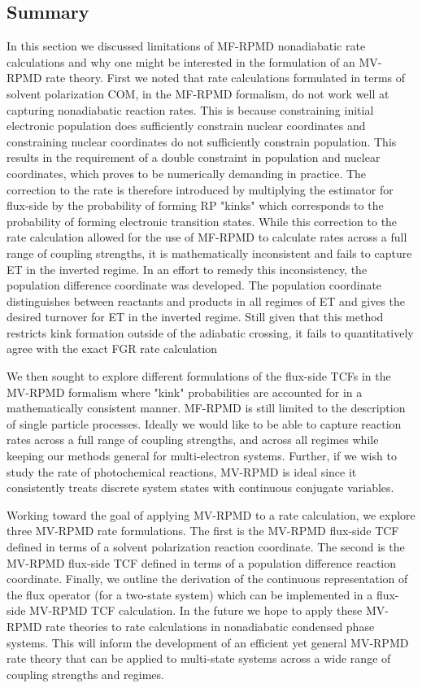 \documentclass[phd,tocprelim]{cornell}
\begin{document}
\subsection{Summary}
In this section we discussed limitations of MF-RPMD nonadiabatic rate calculations and why one might be interested in the formulation of an MV-RPMD rate theory. First we noted that rate calculations formulated in terms of solvent polarization COM, in the MF-RPMD formalism, do not work well at capturing nonadiabatic reaction rates. This is because constraining initial electronic population does sufficiently constrain nuclear coordinates and constraining nuclear coordinates do not sufficiently constrain population. This results in the requirement of a double constraint in population and nuclear coordinates, which proves to be numerically demanding in practice. The correction to the rate is therefore introduced by multiplying the estimator for flux-side by the probability of forming RP "kinks" which corresponds to the probability of forming electronic transition states. While this correction to the rate calculation allowed for the use of MF-RPMD to calculate rates across a full range of coupling strengths, it is mathematically inconsistent and fails to capture ET in the inverted regime.
In an effort to remedy this inconsistency, the population difference coordinate was developed. The population coordinate distinguishes between reactants and products in all regimes of ET and gives the desired turnover for ET in the inverted regime. Still given that this method restricts kink formation outside of the adiabatic crossing, it fails to quantitatively agree with the exact FGR rate calculation

We then sought to explore different formulations of the flux-side TCFs in the MV-RPMD formalism where "kink" probabilities are accounted for in a mathematically consistent manner. MF-RPMD is still limited to the description of single particle processes. 
Ideally we would like to be able to capture reaction rates across a full range of coupling strengths, and across all regimes while keeping our methods general for multi-electron systems. Further, if we wish to study the rate of photochemical reactions, MV-RPMD is ideal since it consistently treats discrete system states with continuous conjugate variables.

Working toward the goal of applying MV-RPMD to a rate calculation, we explore three MV-RPMD rate formulations. The first is the MV-RPMD flux-side TCF defined in terms of a solvent polarization reaction coordinate. The second is the MV-RPMD flux-side TCF defined in terms of a population difference reaction coordinate. Finally, we outline the derivation of the continuous representation of the flux operator (for a two-state system) which can be implemented in a flux-side MV-RPMD TCF calculation. In the future we hope to apply these MV-RPMD rate theories to rate calculations in nonadiabatic condensed phase systems. This will inform the development of an efficient yet general MV-RPMD rate theory that can be applied to multi-state systems across a wide range of coupling strengths and regimes. 
\end{document}
